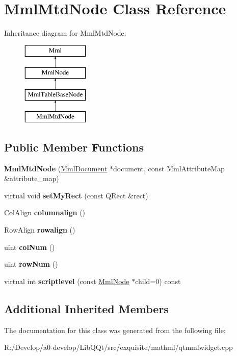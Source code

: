\hypertarget{class_mml_mtd_node}{}\section{Mml\+Mtd\+Node Class Reference}
\label{class_mml_mtd_node}
Inheritance diagram for Mml\+Mtd\+Node\+:\begin{figure}[H]
\begin{center}
\leavevmode
\includegraphics[height=4.000000cm]{class_mml_mtd_node}
\end{center}
\end{figure}
\subsection*{Public Member Functions}
\begin{DoxyCompactItemize}
\item 
\mbox{\label{class_mml_mtd_node_accc693247c700044d5eea22535ba2132}} 
{\bfseries Mml\+Mtd\+Node} (\mbox{\hyperlink{class_mml_document}{Mml\+Document}} $\ast$document, const Mml\+Attribute\+Map \&attribute\+\_\+map)
\item 
\mbox{\label{class_mml_mtd_node_ab4dd28e18e2bd92c4adf9dfc850cd18b}} 
virtual void {\bfseries set\+My\+Rect} (const Q\+Rect \&rect)
\item 
\mbox{\label{class_mml_mtd_node_acb17ed4a754226edb9bccbc1f06332f2}} 
Col\+Align {\bfseries columnalign} ()
\item 
\mbox{\label{class_mml_mtd_node_a7e4796629776c32ad078f81a834594ec}} 
Row\+Align {\bfseries rowalign} ()
\item 
\mbox{\label{class_mml_mtd_node_a4c434c72e0acf0b157c5f8cd04fdf386}} 
uint {\bfseries col\+Num} ()
\item 
\mbox{\label{class_mml_mtd_node_a9b753c8650ddf70c75bd6b2eb5206e60}} 
uint {\bfseries row\+Num} ()
\item 
\mbox{\label{class_mml_mtd_node_a2b28c65951d357e3e81fcdde576cc6b6}} 
virtual int {\bfseries scriptlevel} (const \mbox{\hyperlink{class_mml_node}{Mml\+Node}} $\ast$child=0) const
\end{DoxyCompactItemize}
\subsection*{Additional Inherited Members}


The documentation for this class was generated from the following file\+:\begin{DoxyCompactItemize}
\item 
R\+:/\+Develop/a0-\/develop/\+Lib\+Q\+Qt/src/exquisite/mathml/qtmmlwidget.\+cpp\end{DoxyCompactItemize}
